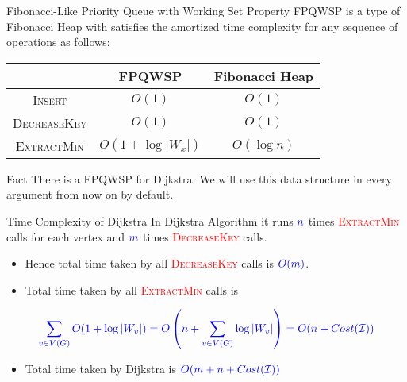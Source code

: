 \documentclass[10pt]{beamer}
\begin{document}
\begin{frame}{Fibonacci-Like Priority Queue with Working Set Property}
	FPQWSP  is a type of Fibonacci Heap with satisfies the amortized time complexity for any sequence of operations as follows:\vfill \pause

	\begin{center}
		\begin{tabular}{|c|c|c|}
			\hline
			                     & FPQWSP           & Fibonacci Heap \\ \hline
			\textsc{Insert}      & $O(1)$           & $O(1)$         \\  \hline
			\textsc{DecreaseKey} & $O(1)$           & $O(1)$         \\ \hline
			\textsc{ExtractMin}  & $O(1+\log|W_x|)$ & $O(\log n)$    \\ \hline
		\end{tabular}
	\end{center}\pause
	\vfill


	\begin{alertblock}{Fact}
		There is a FPQWSP for Dijkstra. We will use this data structure in every argument from now on by default.
	\end{alertblock}
\end{frame}
\begin{frame}{Time Complexity of Dijkstra}
	In Dijkstra Algorithm it runs $\mathcolor{blue}{n}$ times \textcolor{red}{\textsc{ExtractMin}} calls for each vertex and $\mathcolor{blue}{m}$ times \textcolor{red}{\textsc{DecreaseKey}} calls.\pause
	\begin{itemize}
		\item Hence total time taken by all \textcolor{red}{\textsc{DecreaseKey}} calls is $\mathcolor{blue}{O(m)}$.\pause
		\item Total time taken by all \textcolor{red}{\textsc{ExtractMin}} calls is
	\end{itemize}
	$$
		\mathcolor{blue}{\sum\limits_{v\in V(G)}O(1+\log|W_v|)= O\left(n+\sum\limits_{v\in V(G)} \log |W_v| \right)= O(n+Cost(\mathcal{I}))}
	$$
	\begin{itemize}
		\item Total time taken by Dijkstra is $\mathcolor{blue}{O(m+n+Cost(\mathcal{I}))}$
	\end{itemize}
\end{frame}
\end{document}
